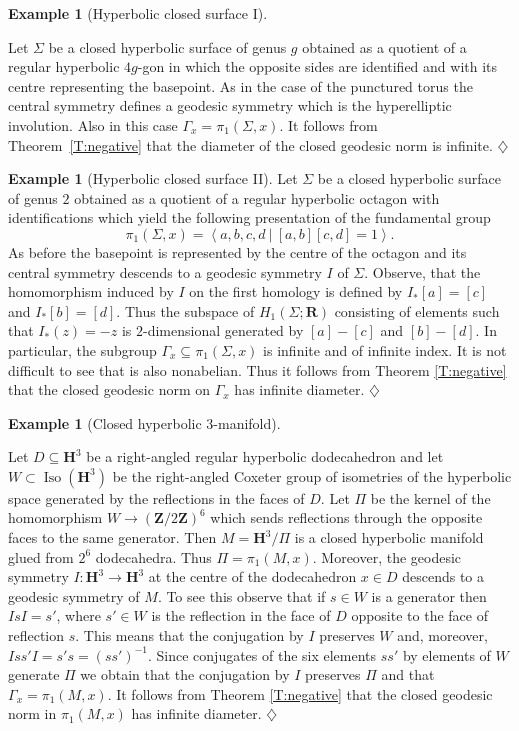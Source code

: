 \documentclass[12pt]{amsart}
\newcommand{\B}[1]{{\mathbf #1}}
\theoremstyle{definition}
\newtheorem{example}[subsection]{Example}
\theoremstyle{remark}
\numberwithin{figure}{section}
\numberwithin{table}{section}
\numberwithin{equation}{section}
\newcommand{\OP}{\operatorname}
\begin{document}
\begin{example}[Hyperbolic closed surface I]\label{E:closed-surface}

Let $\Sigma$ be a closed hyperbolic surface of genus $g$ obtained as a quotient
of a regular hyperbolic $4g$-gon in which the opposite sides are identified and
with its centre representing the basepoint. As in the case of the punctured
torus the central symmetry defines a geodesic symmetry which is the
hyperelliptic involution.  Also in this case $\Gamma_x=\pi_1(\Sigma,x)$. It
follows from Theorem~\ref{T:negative} that the diameter of the closed geodesic
norm is infinite.  \hfill $\diamondsuit$

\end{example}

\begin{example}[Hyperbolic closed surface II]\label{E:genus=2}
Let $\Sigma$ be a closed hyperbolic surface of genus $2$ obtained as
a quotient of a regular hyperbolic octagon with identifications
which yield the following presentation of the fundamental group
$$
\pi_1(\Sigma,x) = 
\left\langle a,b,c,d \ |\ [a,b][c,d]=1 \right\rangle.
$$
As before the basepoint is represented by the centre of the octagon
and its central symmetry descends to a geodesic symmetry $I$ of 
$\Sigma$. Observe, that the homomorphism induced by $I$ on
the first homology is defined by $I_*[a] = [c]$ and $I_*[b]=[d]$.
Thus the subspace of $H_1(\Sigma;\B R)$ consisting of
elements such that $I_*(z)=-z$ is $2$-dimensional
generated by $[a]-[c]$ and $[b]-[d]$. In particular, the
subgroup $\Gamma_x\subseteq \pi_1(\Sigma,x)$ is infinite and of infinite index.
It is not difficult to see that is  also nonabelian.
Thus it follows from Theorem \ref{T:negative} that
the closed geodesic norm on $\Gamma_x$ has infinite diameter.
\hfill $\diamondsuit$
\end{example}

\begin{example}[Closed hyperbolic $3$-manifold]\label{E:hyperbolic-3d}

Let $D\subseteq \B H^3$ be a right-angled regular hyperbolic dodecahedron and
let $W\subset \OP{Iso}(\B H^3)$ be the right-angled Coxeter group of isometries
of the hyperbolic space generated by the reflections in the faces of $D$. Let
$\Pi$ be the kernel of the homomorphism $W\to (\B Z/2\B Z)^6$ which sends
reflections through the opposite faces to the same generator.  
Then $M= \B H^3/\Pi$ is a closed hyperbolic manifold glued from $2^6$
dodecahedra. Thus $\Pi=\pi_1(M,x)$. Moreover, the geodesic symmetry 
$I\colon \B H^3\to \B H^3$ at the centre of the dodecahedron $x\in D$
descends to a geodesic symmetry of $M$.  To see this observe that if $s\in W$
is a generator then $IsI=s'$, where $s'\in W$ is the reflection in the face of
$D$ opposite to the face of reflection $s$. This means that the conjugation by
$I$ preserves $W$ and, moreover, $Iss'I = s's = (ss')^{-1}$. Since conjugates
of the six elements $ss'$ by elements of $W$ generate $\Pi$ we obtain that the
conjugation by $I$ preserves $\Pi$ and that $\Gamma_x = \pi_1(M,x)$.
It follows from Theorem \ref{T:negative} that the closed geodesic norm
in $\pi_1(M,x)$ has infinite diameter.
\hfill $\diamondsuit$
\end{example}
\end{document}
